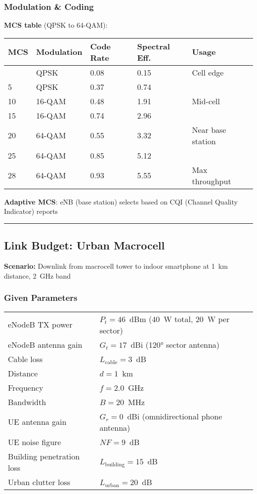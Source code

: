 \subsubsection{Modulation \& Coding}\label{modulation-coding}

\textbf{MCS table} (QPSK to 64-QAM):

{\def\LTcaptype{} %
\begin{longtable}[]{@{}lllll@{}}
\toprule\noalign{}
MCS & Modulation & Code Rate & Spectral Eff. & Usage \\
\midrule\noalign{}
\endhead
\bottomrule\noalign{}
\endlastfoot
0 & QPSK & 0.08 & 0.15 & Cell edge \\
5 & QPSK & 0.37 & 0.74 & \\
10 & 16-QAM & 0.48 & 1.91 & Mid-cell \\
15 & 16-QAM & 0.74 & 2.96 & \\
20 & 64-QAM & 0.55 & 3.32 & Near base station \\
25 & 64-QAM & 0.85 & 5.12 & \\
28 & 64-QAM & 0.93 & 5.55 & Max throughput \\
\end{longtable}
}

\textbf{Adaptive MCS}: eNB (base station) selects based on CQI (Channel
Quality Indicator) reports

\begin{center}\rule{0.5\linewidth}{0.5pt}\end{center}

\subsection{Link Budget: Urban Macrocell}

\textbf{Scenario:} Downlink from macrocell tower to indoor smartphone at 1~km distance, 2~GHz band

\subsubsection*{Given Parameters}

\begin{tabular}{@{}ll@{}}
eNodeB TX power & $P_t = 46$~dBm (40~W total, 20~W per sector) \\
eNodeB antenna gain & $G_t = 17$~dBi (120° sector antenna) \\
Cable loss & $L_{\text{cable}} = 3$~dB \\
Distance & $d = 1$~km \\
Frequency & $f = 2.0$~GHz \\
Bandwidth & $B = 20$~MHz \\
UE antenna gain & $G_r = 0$~dBi (omnidirectional phone antenna) \\
UE noise figure & $NF = 9$~dB \\
Building penetration loss & $L_{\text{building}} = 15$~dB \\
Urban clutter loss & $L_{\text{urban}} = 20$~dB \\
\end{tabular}


